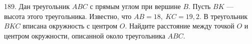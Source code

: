 189. Дан треугольник $ABC$ с прямым углом при вершине $B.$ Пусть $BK$ --- высота этого треугольника. Известно, что $AB=18,\ KC=19,2.$ В треугольник $BKC$ вписана окружность с центром $O.$ Найдите расстояние между точкой $O$ и центром окружности, описанной около треугольника $ABC.$\\
